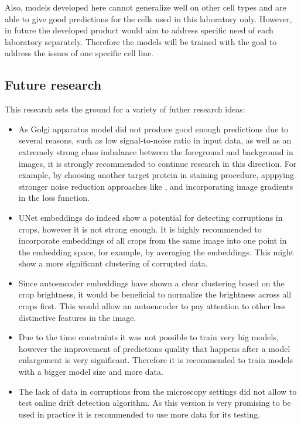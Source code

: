 Also, models developed here cannot generalize well on other cell types and are able to give good predictions for the cells used in this laboratory only. However, in future the developed product would aim to address specific need of each laboratory separately. Therefore the models will be trained with the goal to address the issues of one specific cell line. 


\subsection{Future research}
This research sets the ground for a variety of futher research ideas:
\begin{itemize}
    \item As Golgi apparatus model did not produce good enough predictions due to several reasons, such as low signal-to-noise ratio in input data, as well as an extremely strong class imbalance between the foreground and background in images, it is strongly recommended to continue research in this direction. For example, by choosing another target protein in staining procedure, apppying stronger noise reduction approaches like \cite{noise2void}, and incorporating image gradients in the loss function.
    \item UNet embeddings do indeed show a potential for detecting corruptions in crops, however it is not strong enough. It is highly recommended to incorporate embeddings of all crops from the same image into one point in the embedding space, for example, by averaging the embeddings. This might show a more significant clustering of corrupted data.
    \item Since autoencoder embeddings have shown a clear clustering based on the crop brightness, it would be beneficial to normalize the brightness across all crops first. This would allow an autoencoder to pay attention to other less distinctive features in the image.
    \item Due to the time constraints it was not possible to train very big models, however the improvement of predictions quality that happens after a model enlargement is very significant. Therefore it is recommended to train models with a bigger model size and more data.
    \item The lack of data in corruptions from the microscopy settings did not allow to test online drift detection algorithm. As this version is very promising to be used in practice it is recommended to use more data for its testing.
\end{itemize}
 